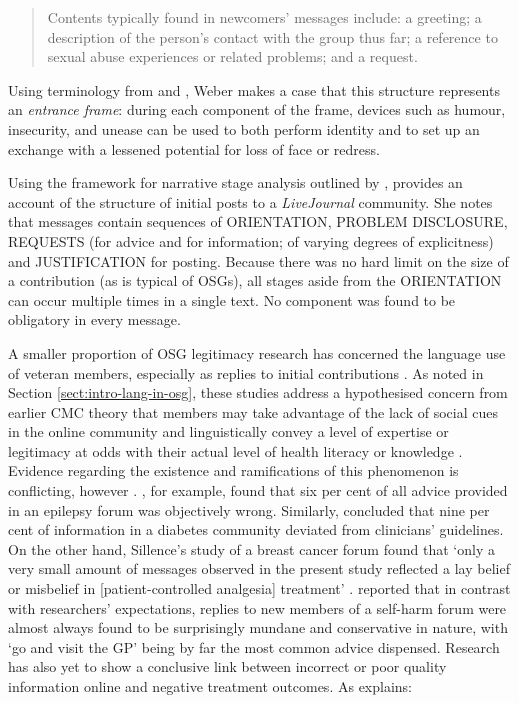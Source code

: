 \documentclass{article}
\renewcommand{\cite}{\parencite}
\begin{document}
\begin{quote}\small\singlespacing
Contents typically found in newcomers' messages include: a greeting; a description of the person's contact with the group thus far; a reference to sexual abuse experiences or related problems; and a request.
\end{quote}
%
Using terminology from \textcite{goffman_presentation_1959} and \textcite{brown_politeness:_1987}, Weber makes a case that this structure represents an \emph{entrance frame}: during each component of the frame, devices such as humour, insecurity, and unease can be used to both perform identity and to set up an exchange with a lessened potential for loss of face or redress. 

Using the framework for narrative stage analysis outlined by \textcite{labov_narrative_1997}, \textcite{kouper_pragmatics_2010} provides an account of the structure of initial posts to a \emph{LiveJournal} community. She notes that messages contain sequences of \textsc{ORIENTATION}, \textsc{PROBLEM DISCLOSURE}, \textsc{REQUESTS} (for advice and for information; of varying degrees of explicitness) and \textsc{JUSTIFICATION} for posting. Because there was no hard limit on the size of a contribution (as is typical of OSGs), all stages aside from the \textsc{ORIENTATION} can occur multiple times in a single text. No component was found to be obligatory in every message.

A smaller proportion of OSG legitimacy research has concerned the language use of veteran members, especially as replies to initial contributions \cite{paulus_`please_2015}. As noted in Section \ref{sect:intro-lang-in-osg}, these studies address a hypothesised concern from earlier CMC theory that members may take advantage of the lack of social cues in the online community and linguistically convey a level of expertise or legitimacy at odds with their actual level of health literacy or knowledge \cite{varga2014grieving}. Evidence regarding the existence and ramifications of this phenomenon is conflicting, however \cite{sillence_giving_2013}. \textcite{hoch_information_1999}, for example, found that six per cent of all advice provided in an epilepsy forum was objectively wrong. Similarly, \textcite{hoffman-goetz_clinical_2009} concluded that nine per cent of information in a diabetes community deviated from clinicians' guidelines. On the other hand, Sillence's study of a breast cancer forum found that `only a very small amount of messages observed in the present study reflected a lay belief or misbelief in [patient-controlled analgesia] treatment' \parencite*[p.~8]{sillence_communicating_2012}. \textcite{smithson_problem_2011} reported that in contrast with researchers' expectations, replies to new members of a self-harm forum were almost always found to be surprisingly mundane and conservative in nature, with `go and visit the GP' being by far the most common advice dispensed. Research has also yet to show a conclusive link between incorrect or poor quality information online and negative treatment outcomes. As \citeauthor{wang_stay_2012} explains:
\end{document}
